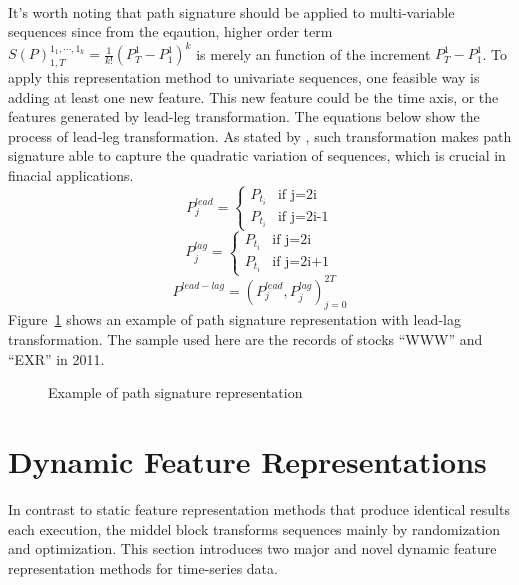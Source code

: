 \\It's worth noting that path signature should be applied to multi-variable sequences since from the eqaution, higher order term $S(P)_{1,T}^{1_1,\cdots,1_k} = \frac{1}{k!}(P_T^1-P_1^1)^k$ is merely an function of the increment $P_T^1-P_1^1$. To apply this representation method to univariate sequences, one feasible way is adding at least one new feature. This new feature could be the time axis, or the features generated by lead-leg transformation. The equations below show the process of lead-leg transformation. As stated by \cite{chevyrev2016primer}, such transformation makes path signature able to capture the quadratic variation of sequences, which is crucial in finacial applications. 
\begin{equation}
    P_j^{lead}=
    \begin{cases}
    P_{t_i}& \text{if j=2i}\\
    P_{t_i}& \text{if j=2i-1}
    \end{cases}   
\end{equation}
\begin{equation}
    P_j^{lag}=
    \begin{cases}
    P_{t_i}& \text{if j=2i}\\
    P_{t_i}& \text{if j=2i+1}
    \end{cases}   
\end{equation}
\begin{equation}
    P^{lead-lag} = (P_j^{lead},P_j^{lag})_{j=0}^{2T}
\end{equation}
Figure~\ref{fig:signature1} shows an example of path signature representation with lead-lag transformation. The sample used here are the records of stocks ``WWW'' and ``EXR'' in 2011.
\begin{figure}[!htbp]
    \centering 
    \caption{Example of path signature representation} 
    \label{fig:signature1} 
\end{figure} 


\section{Dynamic Feature Representations}
In contrast to static feature representation methods that produce identical results each execution, the middel block transforms sequences mainly by randomization and optimization. This section introduces two major and novel dynamic feature representation methods for time-series data.
